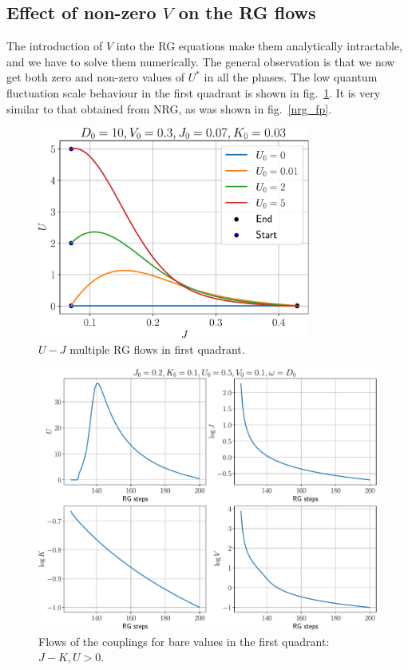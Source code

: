 \documentclass[12pt,twoside]{report}
\numberwithin{equation}{section}
\begin{document}
\subsection{Effect of non-zero \(V\) on the RG flows}
The introduction of \(V\) into the RG equations make them analytically intractable, and we have to solve them numerically. The general observation is that we now get both zero and non-zero values of \(U^*\) in all the phases. The low quantum fluctuation scale behaviour in the first quadrant is shown in fig.~\ref{Veffect}. It is very similar to that obtained from NRG, as was shown in fig.~\ref{nrg_fp}.
\begin{figure}[htpb]
	\centering
	\includegraphics[width=0.8\textwidth]{../figures/UvsJ.pdf}
	\caption{\(U-J\) multiple RG flows in first quadrant.}
	\label{Veffect}
\end{figure}

\begin{figure}[htpb!]
	\centering
	\includegraphics[width=\textwidth]{../figures/with_V.pdf}
	\caption{Flows of the couplings for bare values in the first quadrant: \(J-K,U>0\).}
\end{figure}
\end{document}
